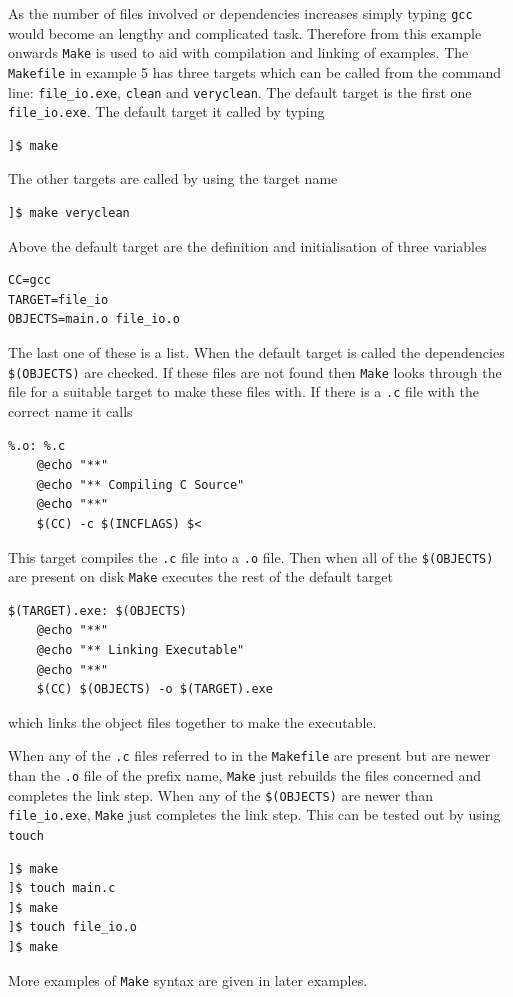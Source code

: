 \documentclass[11pt]{scrartcl}
\begin{document}
As the number of files involved or dependencies increases simply
typing \texttt{gcc} would become an lengthy and complicated
task. Therefore from this example onwards \texttt{Make}\cite{make} is
used to aid with compilation and linking of examples.  The
\texttt{Makefile} in example 5 has three targets which can be called
from the command line:
\texttt{file\_io.exe}, \texttt{clean} and \texttt{veryclean}.  The
default target is the first one \texttt{file\_io.exe}.  The default
target it called by typing
\lstset{language=make}
\begin{verbatim}
]$ make
\end{verbatim} %
The other targets are called by using the target name
\begin{verbatim}
]$ make veryclean
\end{verbatim} %
Above the default target are the definition and initialisation of
three variables
\begin{lstlisting}
CC=gcc
TARGET=file_io
OBJECTS=main.o file_io.o
\end{lstlisting}
The last one of these is a list.  When the default target is called
the dependencies \texttt{\$(OBJECTS)} are checked.  If these files are
not found then \texttt{Make} looks through the file for a suitable
target to make these files with.  If there is a \texttt{.c} file with
the correct name it calls
\begin{lstlisting}
%.o: %.c
	@echo "**"
	@echo "** Compiling C Source" 
	@echo "**"
	$(CC) -c $(INCFLAGS) $<
\end{lstlisting} %
This target compiles the \texttt{.c} file into a \texttt{.o} file.
Then when all of the \texttt{\$(OBJECTS)} are present on disk
\texttt{Make} executes the rest of the default target
\begin{lstlisting}
$(TARGET).exe: $(OBJECTS)
	@echo "**"
	@echo "** Linking Executable"
	@echo "**"
	$(CC) $(OBJECTS) -o $(TARGET).exe
\end{lstlisting} %
which links the object files together to make the executable.

When any of the \texttt{.c} files referred to in the \texttt{Makefile}
are present but are newer than the \texttt{.o} file of the prefix
name, \texttt{Make} just rebuilds the files concerned and
completes the link step.  When any of the \texttt{\$(OBJECTS)} are
newer than \texttt{file\_io.exe}, \texttt{Make} just completes the
link step.  This can be tested out by using \texttt{touch}
\begin{verbatim}
]$ make
]$ touch main.c
]$ make
]$ touch file_io.o
]$ make
\end{verbatim} %
More examples of \texttt{Make} syntax are given in later examples.
\end{document}
